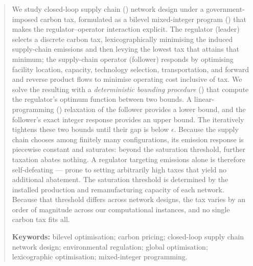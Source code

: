 
\begin{abstract}
We study closed-loop supply chain (\CLSC) network design under a
government-imposed carbon tax, formulated as a bilevel mixed-integer
program (\BLMIP) that makes the regulator--operator interaction
explicit. The regulator (leader) selects a discrete carbon tax,
lexicographically minimising the induced supply-chain emissions and
then levying the lowest tax that attains that minimum; the
supply-chain operator (follower) responds by optimising facility
location, capacity, technology selection, transportation, and forward
and reverse product flows to minimise operating cost inclusive of tax.
We solve the resulting \BLMIP with a \emph{deterministic bounding
procedure} (\DBP) that compute the regulator's optimum function 
between two bounds. A linear-programming (\LP) relaxation of the 
follower provides a lower bound, and the follower's exact integer 
response provides an upper bound. The \DBP iteratively tightens these 
two bounds until their gap is below $\epsilon$. Because the supply chain 
chooses among finitely many configurations, its emission response is 
piecewise constant and saturates: beyond the saturation threshold, 
further taxation abates nothing. A regulator targeting emissions alone 
is therefore  self-defeating --- prone to setting arbitrarily high taxes 
that yield no additional abatement. The saturation threshold is determined 
by the installed production and remanufacturing capacity of each network. 
Because that threshold differs across network designs, the tax varies 
by an order of magnitude across our computational instances, and no 
single carbon tax fits all.


\bigskip
\noindent\textbf{Keywords:}
bilevel optimisation;\; carbon pricing;\; closed-loop supply chain network design;\;
environmental regulation;\; global optimisation;\;
lexicographic optimisation;\; mixed-integer programming.
\end{abstract}
